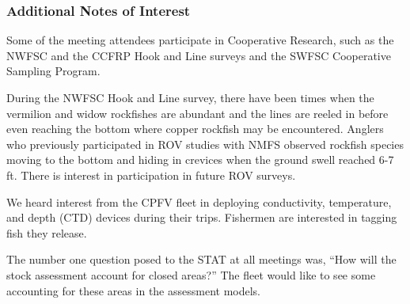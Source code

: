 \documentclass[11pt,
  english,
  letterpaper,
]{article}
\begin{document}
\hypertarget{additional-notes-of-interest}{%
\subsubsection{Additional Notes of Interest}\label{additional-notes-of-interest}}

Some of the meeting attendees participate in Cooperative Research, such as the NWFSC and the CCFRP Hook and Line surveys and the SWFSC Cooperative Sampling Program.

During the NWFSC Hook and Line survey, there have been times when the vermilion and widow rockfishes are abundant and the lines are reeled in before even reaching the bottom where copper rockfish may be encountered. Anglers who previously participated in ROV studies with NMFS observed rockfish species moving to the bottom and hiding in crevices when the ground swell reached 6-7 ft. There is interest in participation in future ROV surveys.

We heard interest from the CPFV fleet in deploying conductivity, temperature, and depth (CTD) devices during their trips. Fishermen are interested in tagging fish they release.

The number one question posed to the STAT at all meetings was, ``How will the stock assessment account for closed areas?'' The fleet would like to see some accounting for these areas in the assessment models.
\end{document}
